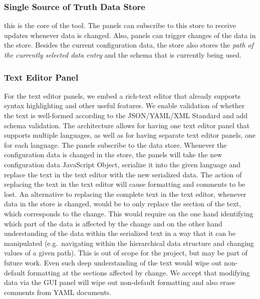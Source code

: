 
\subsubsection{Single Source of Truth Data Store}
this is the core of the tool.
The panels can subscribe to this store to receive updates whenever data is changed.
Also, panels can trigger changes of the data in the store.
Besides the current configuration data, the store also stores the \textit{path of the currently selected data entry} and the schema that is currently being used.


\subsubsection{Text Editor Panel}\label{subsubsec:design_text_editor_panel} %
For the text editor panels, we embed a rich-text editor that already supports syntax highlighting and other useful features.
We enable validation of whether the text is well-formed according to the JSON/YAML/XML Standard and add schema validation.
The architecture allows for having one text editor panel that supports multiple languages, as well as for having separate text editor panels, one for each language.
The panels subscribe to the data store.
Whenever the configuration data is changed in the store, the panels will take the new configuration data JavaScript Object, serialize it into the given language and replace the text in the text editor with the new serialized data.
The action of replacing the text in the text editor will cause formatting and comments to be lost.
An alternative to replacing the complete text in the text editor, whenever data in the store is changed, would be to only replace the section of the text, which corresponds to the change.
This would require on the one hand identifying which part of the data is affected by the change and on the other hand understanding of the data within the serialized text in a way that it can be manipulated (e.g.\ navigating within the hierarchical data structure and changing values of a given path).
This is out of scope for the project, but may be part of future work.
Even such deep understanding of the text would wipe out non-default formatting at the sections affected by change.
We accept that modifying data via the GUI panel will wipe out non-default formatting and also erase comments from YAML documents.


